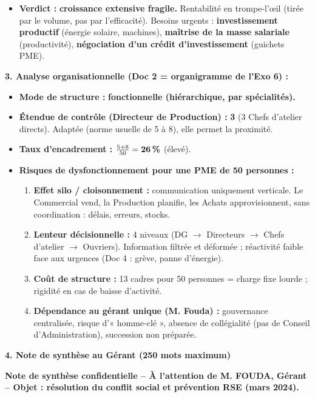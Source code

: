 \documentclass[11pt]{article}
\begin{document}
\begin{corrige}
\begin{itemize}
\begin{itemize}
        \item \textbf{Verdict :} \textbf{croissance extensive fragile.} Rentabilité en trompe-l'œil (tirée par le volume, pas par l'efficacité). Besoins urgents : \textbf{investissement productif} (énergie solaire, machines), \textbf{maîtrise de la masse salariale} (productivité), \textbf{négociation d'un crédit d'investissement} (guichets PME).
    \end{itemize}
\end{itemize}

\textbf{3. Analyse organisationnelle (Doc 2 = organigramme de l'Exo 6) :}
\begin{itemize}
    \item \textbf{Mode de structure :} \textbf{fonctionnelle (hiérarchique, par spécialités).}
    \item \textbf{Étendue de contrôle (Directeur de Production) :} \textbf{3} (3 Chefs d'atelier directs). Adaptée (norme usuelle de 5 à 8), elle permet la proximité.
    \item \textbf{Taux d'encadrement :} $\frac{5+8}{50} = \textbf{26\,\%}$ (élevé).
    \item \textbf{Risques de dysfonctionnement pour une PME de 50 personnes :}
    \begin{enumerate}
        \item \textbf{Effet silo / cloisonnement :} communication uniquement verticale. Le Commercial vend, la Production planifie, les Achats approvisionnent, sans coordination : délais, erreurs, stocks.
        \item \textbf{Lenteur décisionnelle :} 4 niveaux (DG $\rightarrow$ Directeurs $\rightarrow$ Chefs d'atelier $\rightarrow$ Ouvriers). Information filtrée et déformée ; réactivité faible face aux urgences (Doc 4 : grève, panne d'énergie).
        \item \textbf{Coût de structure :} 13 cadres pour 50 personnes = charge fixe lourde ; rigidité en cas de baisse d'activité.
        \item \textbf{Dépendance au gérant unique (M. Fouda) :} gouvernance centralisée, risque d'« homme-clé », absence de collégialité (pas de Conseil d'Administration), succession non préparée.
    \end{enumerate}
\end{itemize}

\textbf{4. Note de synthèse au Gérant (250 mots maximum)}

\textbf{Note de synthèse confidentielle -- À l'attention de M. FOUDA, Gérant -- Objet : résolution du conflit social et prévention RSE (mars 2024).}


\end{corrige}
\end{document}
